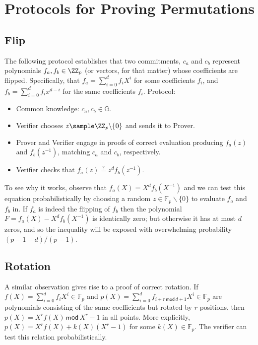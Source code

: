 
\section{Protocols for Proving Permutations}

\subsection{Flip}\label{apx:reverse}

The following protocol establishes that two commitments, $c_a$ and $c_b$ represent polynomials $f_a, f_b \in \ZZ_p$ (or vectors, for that matter) whose coefficients are flipped. Specifically, that $f_a = \sum_{i=0}^{d}f_i X^i$ for some coefficients $f_i$, and $f_b = \sum_{i=0}^df_ix^{d-i}$ for the same coefficients $f_i$.
Protocol:
\begin{itemize}
    \item Common knowledge: $c_a, c_b \in \mathbb{G}$.
    \item Verifier chooses $z \sample \ZZ_p \backslash \{0\}$ and sends it to Prover.
    \item Prover and Verifier engage in proofs of correct evaluation producing $f_a(z)$ and $f_b(z^{-1})$, matching $c_a$ and $c_b$, respectively.
    \item Verifier checks that $f_a(z) \stackrel{?}{=} z^d f_b(z^{-1})$.
\end{itemize}

To see why it works, observe that $f_a(X) = X^df_b(X^{-1})$ and we can test this equation probabilistically by choosing a random $z \in \mathbb{F}_p \backslash \{0\}$ to evaluate $f_a$ and $f_b$ in. If $f_a$ is indeed the flipping of $f_b$ then the polynomial $F = f_a(X) - X^df_b(X^{-1})$ is identically zero; but otherwise it has at most $d$ zeros, and so the inequality will be exposed with overwhelming probability $(p-1-d)/(p-1)$.

\subsection{Rotation}

A similar observation gives rise to a proof of correct rotation. If $f(X) = \sum_{i=0}^d f_i X^i \in \mathbb{F}_p$ and $p(X) = \sum_{i=0}^d f_{i+r \, \mathsf{mod} \, d+1} X^i \in \mathbb{F}_p$ are polynomials consisting of the same coefficients but rotated by $r$ positions, then $p(X) = X^r f(X) \, \mathsf{mod} \, X^r - 1$ in all points. More explicitly, $p(X) = X^r f(X) + k(X) (X^r - 1)$ for some $k(X) \in \mathbb{F}_p$. The verifier can test this relation probabilistically.

